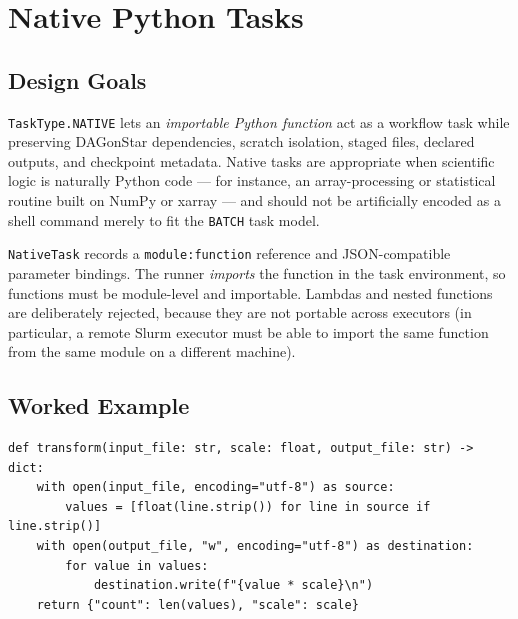 \chapter{Native Python Tasks}
\label{ch:native-tasks}

\section{Design Goals}

\texttt{TaskType.NATIVE} lets an \emph{importable Python function} act as a
workflow task while preserving DAGonStar dependencies, scratch isolation,
staged files, declared outputs, and checkpoint metadata. Native tasks are
appropriate when scientific logic is naturally Python code --- for instance,
an array-processing or statistical routine built on NumPy or xarray --- and
should not be artificially encoded as a shell command merely to fit the
\texttt{BATCH} task model.

\begin{cautionbox}
\texttt{NativeTask} records a \texttt{module:function} reference and
JSON-compatible parameter bindings. The runner \emph{imports} the function in
the task environment, so functions must be module-level and importable.
Lambdas and nested functions are deliberately rejected, because they are not
portable across executors (in particular, a remote Slurm executor must be
able to import the same function from the same module on a different
machine).
\end{cautionbox}

\section{Worked Example}

\begin{lstlisting}[caption={\texttt{native\_functions.py}: the importable native function.}]
def transform(input_file: str, scale: float, output_file: str) -> dict:
    with open(input_file, encoding="utf-8") as source:
        values = [float(line.strip()) for line in source if line.strip()]
    with open(output_file, "w", encoding="utf-8") as destination:
        for value in values:
            destination.write(f"{value * scale}\n")
    return {"count": len(values), "scale": scale}
\end{lstlisting}

